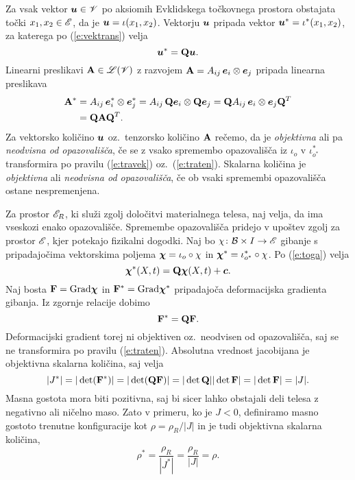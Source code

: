 Za vsak vektor $\boldsymbol u\in\mathscr V$ po aksiomih Evklidskega točkovnega prostora obstajata
točki $x_1,x_2\in\mathscr E$, da je $\boldsymbol u=\iota(x_1,x_2)$. Vektorju $\boldsymbol u$ pripada
vektor $\boldsymbol u^*=\iota^*(x_1,x_2)$, za katerega po (\ref{e:vektrans}) velja
\begin{equation} \label{e:travek}
	\boldsymbol u^*=\mathbf Q\boldsymbol u.
\end{equation}
Linearni preslikavi $\mathbf A\in\mathscr L(\mathscr V)$ z razvojem $\mathbf A=A_{ij}\,\boldsymbol e_i\otimes\boldsymbol e_j$
pripada linearna preslikava
\begin{align}
	\mathbf A^*&=A_{ij}\,\boldsymbol e^*_i\otimes\boldsymbol e^*_j=A_{ij}\,\mathbf Q\boldsymbol e_i\otimes\mathbf Q\boldsymbol e_j
	=\mathbf QA_{ij}\,\boldsymbol e_i\otimes\boldsymbol e_j\mathbf Q^T \nonumber \\
	&=\mathbf Q\mathbf A\mathbf Q^T. \label{e:traten}
\end{align}
Za vektorsko količino $\boldsymbol u$ oz.~tenzorsko količino $\mathbf A$
rečemo, da je \emph{objektivna} ali pa \emph{neodvisna od opazovališča},
če se z vsako spremembo opazovališča iz $\iota_o$ v $\iota^*_{o^*}$
transformira po pravilu (\ref{e:travek}) oz.~(\ref{e:traten}).
Skalarna količina je \emph{objektivna} ali \emph{neodvisna od opazovališča},
če ob vsaki spremembi opazovališča ostane nespremenjena.

Za prostor $\mathscr E_R$, ki služi zgolj določitvi materialnega telesa, naj velja,
da ima vseskozi enako opazovališče. Spremembe opazovališča pridejo v upoštev zgolj
za prostor $\mathscr E$, kjer potekajo fizikalni dogodki. Naj bo $\chi\colon\mathcal B\times I\to\mathscr E$
gibanje s pripadajočima vektorskima poljema $\boldsymbol \chi=\iota_o\circ\chi$ in
$\boldsymbol \chi^*=\iota^*_{o^*}\circ\chi$. Po (\ref{e:toga}) velja
\[
	\boldsymbol \chi^*(X,t)=\mathbf Q\boldsymbol \chi(X,t)+\boldsymbol c.
\]
Naj bosta $\mathbf F=\mathrm{Grad}\boldsymbol \chi$ in $\mathbf F^*=\mathrm{Grad}\boldsymbol \chi^*$ pripadajoča
deformacijska gradienta gibanja. Iz zgornje relacije dobimo
\[
	\mathbf F^*=\mathbf Q\mathbf F.
\]
Deformacijski gradient torej ni objektiven oz.~neodvisen od opazovališča, saj se ne
transformira po pravilu (\ref{e:traten}). Absolutna vrednost jacobijana je objektivna skalarna
količina, saj velja
\[
	|J^*|=|\det(\mathbf F^*)|=|\det(\mathbf Q\mathbf F)|=|\det\mathbf Q||\det\mathbf F|
	=|\det\mathbf F|=|J|.
\]
Masna gostota mora biti pozitivna, saj bi sicer lahko obstajali deli telesa
z negativno ali ničelno maso. Zato v primeru, ko je $J<0$, definiramo masno
gostoto trenutne konfiguracije kot $\rho=\rho_R/|J|$ in je tudi objektivna skalarna količina,
\[ \rho^*=\frac{\rho_R}{|J^*|}=\frac{\rho_R}{|J|}=\rho. \]

